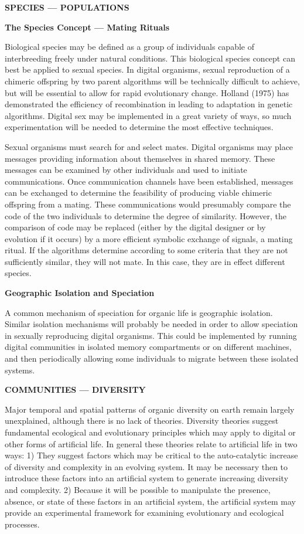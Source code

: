 \LP
\bf SPECIES --- POPULATIONS\rm
\eLP

\LP
\bf The Species Concept --- Mating Rituals\rm
\eLP

Biological species may be defined as a group of individuals capable of
interbreeding freely under natural conditions.  This biological species
concept can best be applied to sexual species.  In digital
organisms, sexual reproduction of a chimeric offspring by two parent
algorithms will be technically difficult to achieve, but will be
essential to allow for rapid evolutionary change.  Holland (1975)
has demonstrated the efficiency of recombination in leading to adaptation
in genetic algorithms.  Digital sex may be implemented in a great
variety of ways, so much experimentation will be needed to determine
the most effective techniques.

Sexual organisms must search for and select mates.  Digital organisms
may place messages providing information about themselves in shared memory.
These messages can be examined by other individuals and used to initiate
communications.  Once communication channels have been
established, messages can be exchanged to determine the feasibility of
producing viable chimeric offspring from a mating.  These communications
would presumably compare the code of the two individuals to determine the
degree of similarity.  However, the comparison of code may be replaced
(either by the digital designer or by evolution if it occurs)
by a more efficient symbolic exchange of signals, a mating ritual.  If
the algorithms determine according to some criteria that they are not
sufficiently similar, they will not mate.  In this case, they are in
effect different species.

\LP
\bf Geographic Isolation and Speciation\rm
\eLP

A common mechanism of speciation for organic life is geographic
isolation.  Similar isolation mechanisms will probably be needed in
order to allow speciation in sexually reproducing digital organisms.  This
could be implemented by running digital communities in isolated memory
compartments or on different machines, and then periodically allowing some
individuals to migrate between these isolated systems.

\LP
\bf COMMUNITIES --- DIVERSITY\rm
\eLP

Major temporal and spatial patterns of organic diversity on earth remain
largely unexplained, although there is no lack of theories.  Diversity
theories suggest fundamental ecological and evolutionary principles which
may apply to digital or other forms of artificial life.  In general these
theories relate to artificial life in two ways:  1) They suggest factors
which may be critical to the auto-catalytic increase of diversity and
complexity in an evolving system.  It may be necessary then to introduce
these factors into an artificial system to generate increasing diversity
and complexity.  2) Because it will be possible to manipulate the presence,
absence, or state of these factors in an artificial system, the artificial
system may provide an experimental framework for examining evolutionary and
ecological processes.

